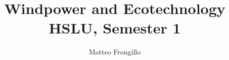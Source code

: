 \documentclass{article}
\title{\textbf{Windpower and Ecotechnology \\ HSLU, Semester 1}}
\author{Matteo Frongillo}
\date{}
\begin{document}
\maketitle
\tableofcontents
\pagebreak
\end{document}
